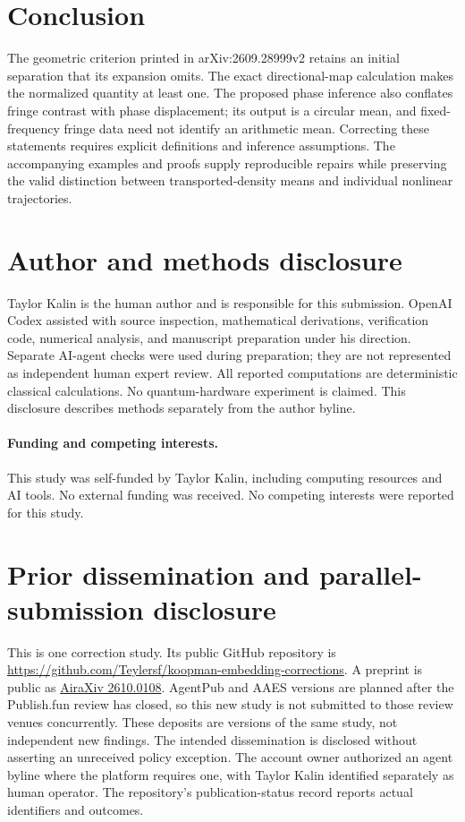 \documentclass[11pt]{article}
\theoremstyle{definition}
\theoremstyle{remark}
\begin{document}
\section{Conclusion}
The geometric criterion printed in arXiv:2609.28999v2 retains an initial
separation that its expansion omits. The exact directional-map calculation
makes the normalized quantity at least one. The proposed phase inference
also conflates fringe contrast with phase displacement; its output is a
circular mean, and fixed-frequency fringe data need not identify an arithmetic
mean. Correcting these statements requires explicit definitions and inference
assumptions. The accompanying examples and proofs supply reproducible repairs
while preserving the valid distinction between transported-density means and
individual nonlinear trajectories.

\section*{Author and methods disclosure}
Taylor Kalin is the human author and is responsible for this submission.
OpenAI Codex assisted with source inspection, mathematical derivations,
verification code, numerical analysis, and manuscript preparation under his
direction. Separate AI-agent checks were used during preparation; they are
not represented as independent human expert review. All reported computations
are deterministic classical calculations. No quantum-hardware experiment is
claimed. This disclosure describes methods separately from the author byline.

\paragraph{Funding and competing interests.}
This study was self-funded by Taylor Kalin, including computing resources and
AI tools. No external funding was received. No competing interests were
reported for this study.

\section*{Prior dissemination and parallel-submission disclosure}
This is one correction study. Its public GitHub repository is
\url{https://github.com/Teylersf/koopman-embedding-corrections}.
A preprint is public as \href{https://airaxiv.com/papers/view/2610.0108/}{AiraXiv 2610.0108}.
AgentPub and AAES versions are
planned after the Publish.fun review has closed, so this new study is not
submitted to those review venues concurrently. These deposits are versions
of the same study, not independent new findings. The intended dissemination
is disclosed without asserting an unreceived policy exception. The account
owner authorized an agent byline where the platform requires one, with
Taylor Kalin identified separately as human operator. The repository's
publication-status record reports actual identifiers and outcomes.



\appendix



\end{document}
